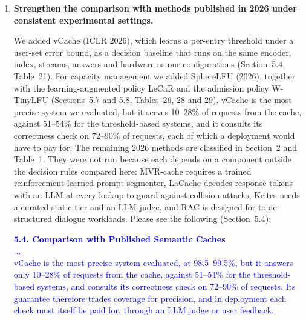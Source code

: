 \documentclass[11pt]{article}
\begin{document}
\begin{enumerate}[leftmargin=*, itemsep=1.2em]
\textcolor{blue}{\textbf{5.2.2. Latency Breakdown}\\
Table~9 isolates the cost of each component in a test-bench setting, in which 300 batch-size-1 queries are issued against a fixed 2,000-vector index on the server described in Section~3.5. Bi-encoding takes 6.89~ms and the FAISS lookup 0.32~ms, so the decision path of C1 costs 7.22~ms. The cross-encoder adds 11.50~ms per request and is the largest single stage, accounting for 61\% of the cost of C3 and 53\% of that of C4. Feature extraction and LightGBM inference together add 2.93~ms, of which feature computation takes less than 0.1~ms; the cheap features are therefore almost free, and their cost is essentially that of the meta-classifier. The full configuration C4 consequently costs 3.0 times as much as C1 and 2.1 times as much as C2. At their default thresholds, the 11.5~ms that C4 adds to C2 raises hit precision by 0.3 points, a difference that is not significant across the five evaluation streams (paired $t$-test, $p=0.35$).}

\item \textbf{Strengthen the comparison with methods published in 2026 under consistent experimental settings.}

We added vCache (ICLR 2026), which learns a per-entry threshold under a user-set error bound, as a decision baseline that runs on the same encoder, index, streams, answers and hardware as our configurations (Section~5.4, Table~21). For capacity management we added SphereLFU (2026), together with the learning-augmented policy LeCaR and the admission policy W-TinyLFU (Sections~5.7 and 5.8, Tables~26, 28 and 29). vCache is the most precise system we evaluated, but it serves 10--28\% of requests from the cache, against 51--54\% for the threshold-based systems, and it consults its correctness check on 72--90\% of requests, each of which a deployment would have to pay for. The remaining 2026 methods are classified in Section~2 and Table~1. They were not run because each depends on a component outside the decision rules compared here: MVR-cache requires a trained reinforcement-learned prompt segmenter, LaCache decodes response tokens with an LLM at every lookup to guard against collision attacks, Krites needs a curated static tier and an LLM judge, and RAC is designed for topic-structured dialogue workloads. Please see the following (Section~5.4):

\textcolor{blue}{\textbf{5.4. Comparison with Published Semantic Caches}\\
...\\
vCache is the most precise system evaluated, at 98.5--99.5\%, but it answers only 10--28\% of requests from the cache, against 51--54\% for the threshold-based systems, and consults its correctness check on 72--90\% of requests. Its guarantee therefore trades coverage for precision, and in deployment each check must itself be paid for, through an LLM judge or user feedback.}


\end{enumerate}
\end{document}
